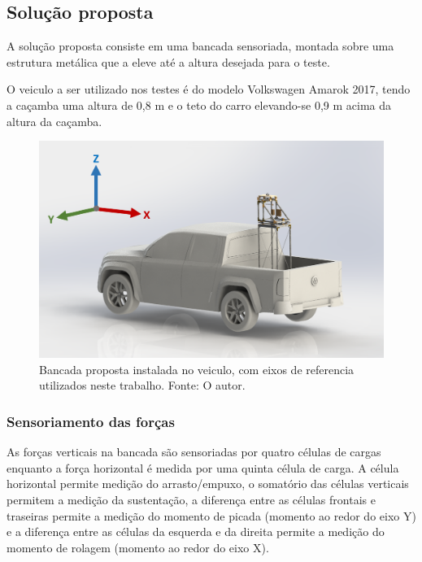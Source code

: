 \subsection{Solução proposta}

A solução proposta consiste em uma bancada sensoriada, montada sobre uma estrutura metálica que a eleve até a altura desejada para o teste.

O veiculo a ser utilizado nos testes é do modelo Volkswagen Amarok 2017, tendo a caçamba uma altura de 0,8 m e o teto do carro elevando-se 0,9 m acima da altura da caçamba.

\begin{figure}[!ht]
    \centering
    \includegraphics[width=.8\linewidth]{figuras/renders/bancada_no_carro_perspectiva_eixos.png}
    \caption{Bancada proposta instalada no veiculo, com eixos de referencia utilizados neste trabalho. Fonte: O autor.}
    \label{fig:placeholder}
\end{figure}

\subsubsection{Sensoriamento das forças}

As forças verticais na bancada são sensoriadas por quatro células de cargas enquanto a força horizontal é medida por uma quinta célula de carga. A célula horizontal permite medição do arrasto/empuxo, o somatório das células verticais permitem a medição da sustentação, a diferença entre as células frontais e traseiras permite a medição do momento de picada (momento ao redor do eixo Y) e a diferença entre as células da esquerda e da direita permite a medição do momento de rolagem (momento ao redor do eixo X).

